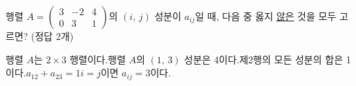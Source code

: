 행렬 $A=\begin{pmatrix} 3 & -2 & 4 \\ 0 & 3 & 1 \end{pmatrix}$의 $(i,\,j)$ 성분이 $a_{ij}$일 때, 다음 중 옳지 \underline{않은} 것을 모두 고르면? (정답 2개)
\begin{choicesv}{행렬 $A$는 $2\times 3$ 행렬이다.}{행렬 $A$의 $(1,\,3)$ 성분은 4이다.}{제2행의 모든 성분의 합은 1이다.}{$a_{12}+a_{23}=1$}{$i=j$이면 $a_{ij}=3$이다.}\end{choicesv}
